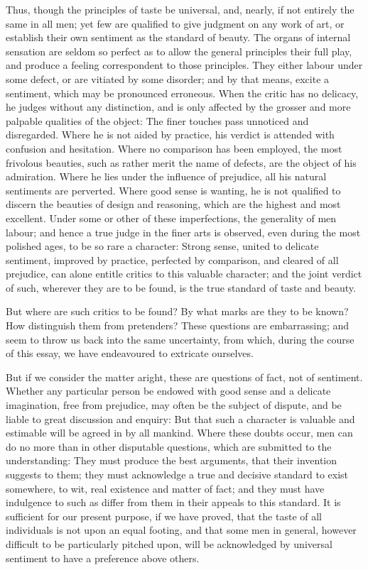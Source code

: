 Thus, though the principles of taste be universal, and, nearly, if not
entirely the same in all men; yet few are qualified to give judgment
on any work of art, or establish their own sentiment as the standard
of beauty. The organs of internal sensation are seldom so perfect as
to allow the general principles their full play, and produce a feeling
correspondent to those principles. They either labour under some
defect, or are vitiated by some disorder; and by that means, excite a
sentiment, which may be pronounced erroneous. When the critic has no
delicacy, he judges without any distinction, and is only affected by
the grosser and more palpable qualities of the object: The finer
touches pass unnoticed and disregarded. Where he is not aided by
practice, his verdict is attended with confusion and hesitation. Where
no comparison has been employed, the most frivolous beauties, such as
rather merit the name of defects, are the object of his admiration.
Where he lies under the influence of prejudice, all his natural
sentiments are perverted. Where good sense is wanting, he is not
qualified to discern the beauties of design and reasoning, which are
the highest and most excellent. Under some or other of these
imperfections, the generality of men labour; and hence a true judge in
the finer arts is observed, even during the most polished ages, to be
so rare a character: Strong sense, united to delicate sentiment,
improved by practice, perfected by comparison, and cleared of all
prejudice, can alone entitle critics to this valuable character; and
the joint  verdict of such, wherever they are to be found,
is the true standard of taste and beauty.

But where are such critics to be found? By what marks are they to be
known? How distinguish them from pretenders? These questions are
embarrassing; and seem to throw us back into the same uncertainty,
from which, during the course of this essay, we have endeavoured to
extricate ourselves.

But if we consider the matter aright, these are questions of fact, not
of sentiment. Whether any particular person be endowed with good sense
and a delicate imagination, free from prejudice, may often be the
subject of dispute, and be liable to great discussion and enquiry: But
that such a character is valuable and estimable will be agreed in by
all mankind. Where these doubts occur, men can do no more than in
other disputable questions, which are submitted to the understanding:
They must produce the best arguments, that their invention suggests to
them; they must acknowledge a true and decisive standard to exist
somewhere, to wit, real existence and matter of fact; and they must
have indulgence to such as differ from them in their appeals to this
standard. It is sufficient for our present purpose, if we have proved,
that the taste of all individuals is not upon an equal footing, and
that some men in general, however difficult to be particularly pitched
upon, will be acknowledged by universal sentiment to have a preference
above others.

